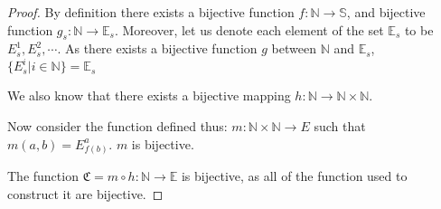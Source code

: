 \documentclass[12pt, a4paper]{article}
\theoremstyle{definition}
\theoremstyle{remark}
\begin{document}
\begin{proof}
	By definition there exists a bijective function $f:\mathbb{N} \rightarrow \mathbb{S}$, and bijective function $g_s :\mathbb{N}\rightarrow \mathbb{E}_s$. Moreover, let us denote each element of the set $\mathbb{E}_s$ to be $E_s^{1}, E_s^2,\cdots.$ As there exists a bijective function $g$ between $\mathbb{N}$ and $\mathbb{E}_s$, $\{E_s^{i}|i\in \mathbb{N}\}=\mathbb{E}_s$

	We also know that there exists a bijective mapping $h:\mathbb{N}\rightarrow \mathbb{N}\times \mathbb{N}$. 
	
	Now consider the function defined thus: $m: \mathbb{N}\times \mathbb{N}\rightarrow E$ such that $m(a,b) = E^a_{f(b)}$. $m$ is bijective.

	The function $\mathfrak{C}=m\circ h: \mathbb{N} \rightarrow \mathbb{E}$ is bijective, as all of the function used to construct it are bijective.



\end{proof}
\end{document}
